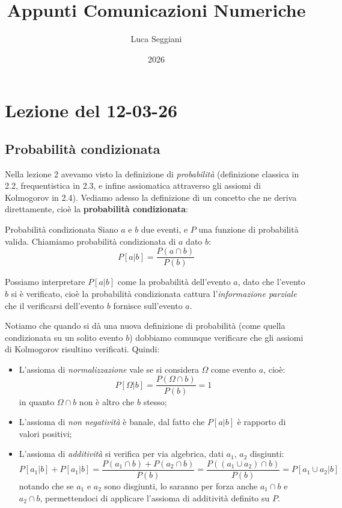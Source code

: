 \documentclass[a4paper,11pt]{article}
\title{Appunti Comunicazioni Numeriche}
\author{Luca Seggiani}
\date{2026}
\begin{document}
\section{Lezione del 12-03-26}

\thispagestyle{empty}
\pagestyle{fancy}

\subsection{Probabilità condizionata}
Nella lezione 2 avevamo visto la definizione di \textit{probabilità} (definizione classica in 2.2, frequentistica in 2.3, e infine assiomatica attraverso gli assiomi di Kolmogorov in 2.4). Vediamo adesso la definizione di un concetto che ne deriva direttamente, cioè la \textbf{probabilità condizionata}:
\begin{definition}{Probabilità condizionata}
	Siano $a$ e $b$ due eventi, e $P$ una funzione di probabilità valida. Chiamiamo probabilità condizionata di $a$ dato $b$:
	$$
	P[a | b] = \frac{P(a \cap b)}{P(b)}
	$$
\end{definition}

Possiamo interpretare $P[a|b]$ come la probabilità dell'evento $a$, dato che l'evento $b$ si è verificato, cioè la probabilità condizionata cattura l'\textit{informazione parziale} che il verificarsi dell'evento $b$ fornisce sull'evento $a$.

Notiamo che quando si dà una nuova definizione di probabilità (come quella condizionata su un solito evento $b$) dobbiamo comunque verificare che gli assiomi di Kolmogorov risultino verificati. Quindi:
\begin{itemize}
	\item L'assioma di \textit{normalizzazione} vale se si considera $\Omega$ come evento $a$, cioè:
		$$
	P[\Omega | b] = \frac{P(\Omega \cap b)}{P(b)} = 1
		$$
		in quanto $\Omega \cap b$ non è altro che $b$ stesso;
	\item L'assioma di \textit{non negatività} è banale, dal fatto che $P[a|b]$ è rapporto di valori positivi;
	\item L'assioma di \textit{additività} si verifica per via algebrica, dati $a_1$, $a_2$ disgiunti:
		$$
		P[a_1 | b] + P[a_1 | b] = \frac{P(a_1 \cap b) + P(a_2 \cap b)}{P(b)} = \frac{P((a_1 \cup a_2) \cap b)}{P(b)} = P[a_1 \cup a_2 | b]
		$$
		notando che se $a_1$ e $a_2$ sono disgiunti, lo saranno per forza anche $a_1 \cap b$ e $a_2 \cap b$, permettendoci di applicare l'assioma di additività definito su $P$. 
\end{itemize}
\end{document}
